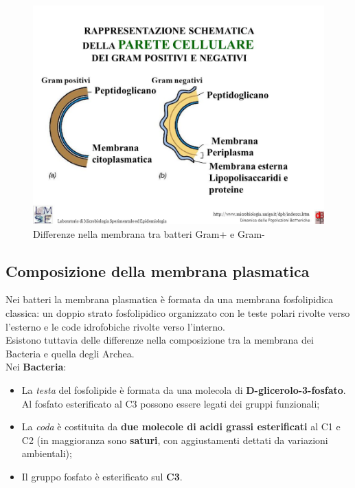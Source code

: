 \documentclass[11pt]{book}
\begin{document}
\clearpage
\begin{figure}[htp]
\centering
\includegraphics[scale=0.40]{img/Parete_cellulare.jpg}
\caption{Differenze nella membrana tra batteri Gram+ e Gram-}
\label{parete_cellulare}
\end{figure}


\subsection{Composizione della membrana plasmatica}
Nei batteri la membrana plasmatica è formata da una membrana fosfolipidica classica: un doppio strato fosfolipidico organizzato con le teste polari rivolte verso l'esterno e le code idrofobiche rivolte verso l'interno.\\

Esistono tuttavia delle differenze nella composizione tra la membrana dei Bacteria e quella degli Archea.\\

Nei \textbf{Bacteria}:
\begin{itemize}
\item La \emph{testa} del fosfolipide è formata da una molecola di \textbf{D-glicerolo-3-fosfato}. Al fosfato esterificato al C3 possono essere legati dei gruppi funzionali;
\item La \emph{coda} è costituita da \textbf{due molecole di acidi grassi esterificati} al C1 e C2 (in maggioranza sono \textbf{saturi}, con aggiustamenti dettati da variazioni ambientali);
\item Il gruppo fosfato è esterificato sul \textbf{C3}.
\end{itemize}
\end{document}
